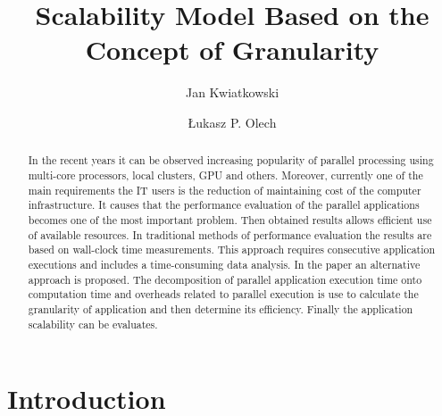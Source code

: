 \documentclass[runningheads]{llncs}
\begin{document}
\title{Scalability Model Based on the Concept of Granularity}


\author{Jan Kwiatkowski \and \L{}ukasz P. Olech}


\pagestyle{empty}


\maketitle

\begin{abstract}
In the recent years it can be observed increasing popularity of parallel processing using multi-core processors, local clusters, GPU and others. Moreover, currently one of the main requirements  the IT users is the reduction of maintaining cost of the computer infrastructure. It causes that the performance evaluation of the parallel applications becomes one of the most important problem. Then obtained  results allows efficient use of available resources. In traditional methods of performance evaluation the results are based on wall-clock time measurements. This approach requires consecutive application executions and includes a time-consuming data analysis. In the paper an alternative approach is proposed. The decomposition of parallel application execution time onto computation time and overheads related to parallel execution is use to calculate the granularity of application and then determine its efficiency. Finally the application scalability can be evaluates.

\end{abstract}

\section{Introduction}
\end{document}
